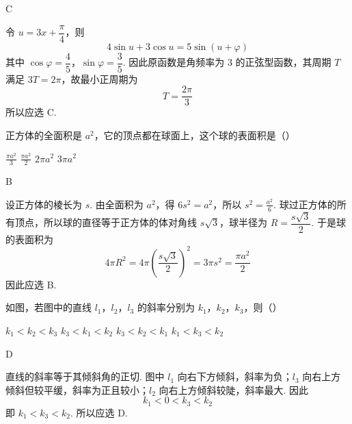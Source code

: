 \documentclass[UTF8,a4paper,oneside,11pt]{ctexbook}
\begin{document}
\begin{answer}
C
\end{answer}

\begin{solution}
令 \(u=3x+\dfrac{\pi}{4}\)，则
\[
4\sin u+3\cos u=5\sin\left(u+\varphi\right)
\]
其中 \(\cos\varphi=\dfrac45\)，\(\sin\varphi=\dfrac35\). 因此原函数是角频率为 \(3\) 的正弦型函数，其周期 \(T\) 满足 \(3T=2\pi\)，故最小正周期为
\[
T=\frac{2\pi}{3}
\]
所以应选 C.
\end{solution}

\begin{problem}
正方体的全面积是 \(a^2\)，它的顶点都在球面上，这个球的表面积是（\quad）

\choices
    {\(\frac{\pi a^2}{3}\)}
    {\(\frac{\pi a^2}{2}\)}
    {\(2\pi a^{2}\)}
    {\(3\pi a^{2}\)}
\end{problem}

\begin{answer}
B
\end{answer}

\begin{solution}
设正方体的棱长为 \(s\). 由全面积为 \(a^2\)，得 \(6s^2=a^2\)，所以 \(s^2=\frac{a^2}{6}\).
球过正方体的所有顶点，所以球的直径等于正方体的体对角线 \(s\sqrt3\)，球半径为 \(R=\dfrac{s\sqrt3}{2}\). 于是球的表面积为
\[
4\pi R^2=4\pi\left(\frac{s\sqrt3}{2}\right)^2=3\pi s^2=\frac{\pi a^2}{2}
\]
因此应选 B.
\end{solution}

\begin{problem}
如图，若图中的直线 \(l_{1}\)，\(l_{2}\)，\(l_{3}\) 的斜率分别为 \(k_{1}\)，\(k_{2}\)，\(k_{3}\)，则（\quad）


\choices
    {\(k_{1} < k_{2} < k_{3}\)}
    {\(k_{3} < k_{1} < k_{2}\)}
    {\(k_{3} < k_{2} < k_{1}\)}
    {\(k_{1} < k_{3} < k_{2}\)}
\end{problem}

\begin{answer}
D
\end{answer}

\begin{solution}
直线的斜率等于其倾斜角的正切. 图中 \(l_1\) 向右下方倾斜，斜率为负；\(l_3\) 向右上方倾斜但较平缓，斜率为正且较小；\(l_2\) 向右上方倾斜较陡，斜率最大. 因此
\[
k_1<0<k_3<k_2
\]
即 \(k_1<k_3<k_2\). 所以应选 D.
\end{solution}
\end{document}
